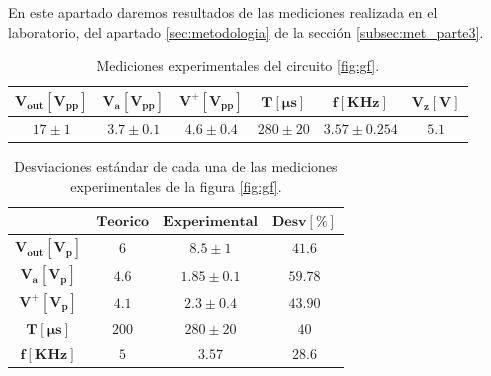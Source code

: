         En este apartado daremos resultados de las mediciones realizada en el laboratorio, del apartado \ref{sec:metodologia} de la sección \ref{subsec:met_parte3}.

        \begin{table}[H]
          \centering
          \begin{tabular}{|c|c|c|c|c|c|}
            \hline
            $\mathbf{V_{out} [V_{pp}]}$ & $\mathbf{V_a [V_{pp}]}$ & $\mathbf{V^+ [V_{pp}]}$ & $\mathbf{T [\mu s]}$ & $\mathbf{f [KHz]}$ & $\mathbf{V_z [V]}$ \\
            \hline
            $17 \pm 1$ & $3.7 \pm 0.1$ & $4.6 \pm 0.4$ & $280 \pm 20$ & $3.57 \pm 0.254$ & $5.1$ \\
            \hline
          \end{tabular}
          \caption{Mediciones experimentales del circuito \ref{fig:gf}.}
          \label{tab:exp_gf}
        \end{table}




        \begin{table}[H]
          \centering
          \begin{tabular}{|c|c|c|c|}
            \hline
            & $\mathbf{Teorico}$ & $\mathbf{Experimental}$ & $\mathbf{Desv [\%]}$ \\
            \hline
            $\mathbf{V_{out} [V_p]}$ & $6$ & $8.5 \pm 1$ & $41.6$ \\
            \hline
            $\mathbf{V_a [V_p]}$ & $4.6$ & $1.85 \pm 0.1$ & $59.78$ \\
            \hline
            $\mathbf{V^+ [V_p]}$ & $4.1$ & $2.3 \pm 0.4$ & $43.90$ \\
            \hline
            $\mathbf{T [\mu s]}$ & $200$ & $280 \pm 20$ & $40$ \\
            \hline
            $\mathbf{f [KHz]}$ & $5$ & $3.57$ & $28.6$ \\
            \hline
          \end{tabular}
          \caption{Desviaciones estándar de cada una de las mediciones experimentales de la figura \ref{fig:gf}.}
          \label{tab:desviacion_gf}
        \end{table}

        
         

